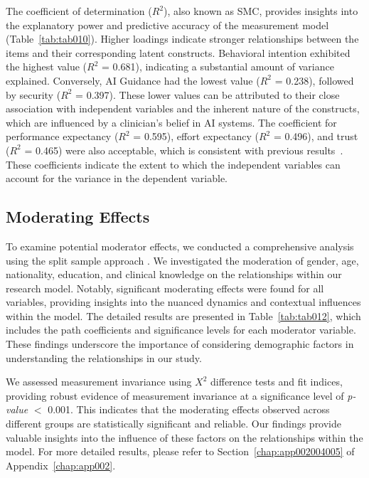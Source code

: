 The coefficient of determination ($R^2$), also known as \ac{SMC}, provides insights into the explanatory power and predictive accuracy of the measurement model (Table~\ref{tab:tab010}).
Higher loadings indicate stronger relationships between the items and their corresponding latent constructs.
Behavioral intention exhibited the highest value ($R^2$ = 0.681), indicating a substantial amount of variance explained.
Conversely, \ac{AI} Guidance had the lowest value ($R^2$ = 0.238), followed by security ($R^2$ = 0.397).
These lower values can be attributed to their close association with independent variables and the inherent nature of the constructs, which are influenced by a clinician's belief in \ac{AI} systems.
The coefficient for performance expectancy ($R^2$ = 0.595), effort expectancy ($R^2$ = 0.496), and trust ($R^2$ = 0.465) were also acceptable, which is consistent with previous results~\cite{KHALILZADEH2017460}.
These coefficients indicate the extent to which the independent variables can account for the variance in the dependent variable.

\subsection{Moderating Effects}
\label{sec:chap004005005}

To examine potential moderator effects, we conducted a comprehensive analysis using the split sample approach \cite{LI2021106581, LI2021106929}.
We investigated the moderation of gender, age, nationality, education, and clinical knowledge on the relationships within our research model.
Notably, significant moderating effects were found for all variables, providing insights into the nuanced dynamics and contextual influences within the model.
The detailed results are presented in Table~\ref{tab:tab012}, which includes the path coefficients and significance levels for each moderator variable.
These findings underscore the importance of considering demographic factors in understanding the relationships in our study.



We assessed measurement invariance using $X^2$ difference tests and fit indices, providing robust evidence of measurement invariance at a significance level of {\it p-value} $<$ 0.001.
This indicates that the moderating effects observed across different groups are statistically significant and reliable.
Our findings provide valuable insights into the influence of these factors on the relationships within the model.
For more detailed results, please refer to Section~\ref{chap:app002004005} of Appendix~\ref{chap:app002}.

